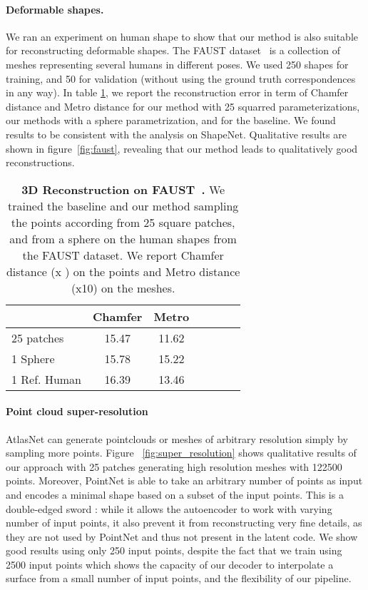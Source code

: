 \documentclass[10pt,twocolumn,letterpaper]{article}
\begin{document}
\paragraph{Deformable shapes.}
We ran an experiment on human shape to show that our method is also suitable for reconstructing deformable shapes. The FAUST dataset~\cite{Bogo:CVPR:2014} is a collection of meshes representing several humans in different poses. We used 250 shapes for training, and 50 for validation (without using the ground truth correspondences in any way). In table \ref{tab:faust}, we report the reconstruction error in term of Chamfer distance and Metro distance for our method with 25 squarred parameterizations, our methods with a sphere parametrization, and for the baseline. We found results to be consistent with the analysis on ShapeNet. Qualitative results are shown in figure~\ref{fig:faust}, revealing that our method leads to qualitatively good reconstructions. 

\begin{table}[h!]
\centering
\begin{tabular}{l|c|c|c|c|c|c}
 & \multicolumn{1}{|l|}{Chamfer} & \multicolumn{1}{|l|}{Metro} \\
\hline
25 patches  & 15.47 &  11.62 \\
1 Sphere  & 15.78 &  15.22 \\
1 Ref. Human & 16.39 & 13.46 
 \end{tabular}


  \caption{{\bf 3D Reconstruction on FAUST~\cite{Bogo:CVPR:2014}.} We trained the baseline and our method sampling the points according from 25 square patches, and from a sphere on the human shapes from the FAUST dataset. We report Chamfer distance (x ) on the points and Metro distance (x10) on the meshes. }\label{tab:faust}
    \vspace{-3mm}
\end{table}



\paragraph{Point cloud super-resolution}
AtlasNet can generate pointclouds or meshes of arbitrary resolution simply by sampling more points.
Figure ~\ref{fig:super_resolution} shows qualitative results of our approach with 25 patches generating high resolution meshes with 122500 points. Moreover,  PointNet is able to take an arbitrary number of points as input and encodes a minimal shape based on a subset of the input points. This is a double-edged sword : while it allows the autoencoder to work with varying number of input points, it also prevent it from reconstructing very fine details, as they are not used by PointNet and thus not present in the latent code. We show good results using only 250 input points, despite the fact that we train using 2500 input points which shows the capacity of our decoder to interpolate a surface from a small number of input points, and the flexibility of our pipeline.
\end{document}
